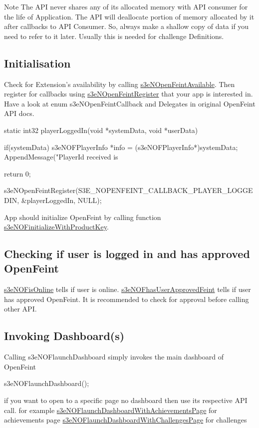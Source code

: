 \begin{DoxyNote}{Note}
The API never shares any of its allocated memory with API consumer for the life of Application. The API will deallocate portion of memory allocated by it after callbacks to API Consumer. So, always make a shallow copy of data if you need to refer to it later. Usually this is needed for challenge Definitions.
\end{DoxyNote}
\hypertarget{main_sec_4_1}{}\subsection{Initialisation}\label{main_sec_4_1}
Check for Extension's availability by calling \hyperlink{group___n_open_feint_api_group_ga6b912a16b413186f3387e8e9a95bcb21}{s3eNOpenFeintAvailable}. Then register for callbacks using \hyperlink{group___n_open_feint_api_group_ga15c3278f021ef1cdbc4f2b522444cc90}{s3eNOpenFeintRegister} that your app is interested in. Have a look at enum s3eNOpenFeintCallback and Delegates in original OpenFeint API docs. 
\begin{DoxyCode}
 static int32 playerLoggedIn(void *systemData, void *userData) 
 {
        if(systemData)
        {
                s3eNOFPlayerInfo *info = (s3eNOFPlayerInfo*)systemData;
                AppendMessage("PlayerId received is %
        }
        
        return 0;
 }
 
 s3eNOpenFeintRegister(S3E_NOPENFEINT_CALLBACK_PLAYER_LOGGEDIN, &playerLoggedIn, 
      NULL);
\end{DoxyCode}


App should initialize OpenFeint by calling function \hyperlink{group___n_open_feint_api_group_gab565578b04e0056a8ce477a9b848a94c}{s3eNOFinitializeWithProductKey}.\hypertarget{main_sec_4_2}{}\subsection{Checking if user is logged in and has approved OpenFeint}\label{main_sec_4_2}
\hyperlink{group___n_open_feint_api_group_ga90b0d5b1df4a437f8c337a61ae7c4678}{s3eNOFisOnline} tells if user is online. \hyperlink{group___n_open_feint_api_group_gaffce9d737cb62d66c7cf64873b1c2aee}{s3eNOFhasUserApprovedFeint} tells if user has approved OpenFeint. It is recommended to check for approval before calling other API.\hypertarget{main_sec_4_3}{}\subsection{Invoking Dashboard(s)}\label{main_sec_4_3}
Calling s3eNOFlaunchDashboard simply invokes the main dashboard of OpenFeint 
\begin{DoxyCode}
                s3eNOFlaunchDashboard();
\end{DoxyCode}
 if you want to open to a specific page no dashboard then use its respective API call. for example \hyperlink{group___n_open_feint_api_group_ga10d29137246b18a6b0aa0f14190eafc8}{s3eNOFlaunchDashboardWithAchievementsPage} for achievements page \hyperlink{group___n_open_feint_api_group_ga298064bb113bc28f0f11dfa88f261ffe}{s3eNOFlaunchDashboardWithChallengesPage} for challenges

